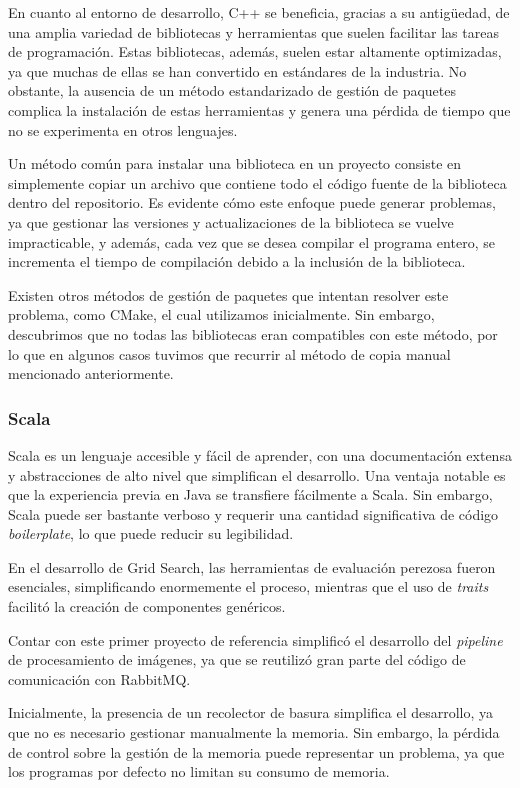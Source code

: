 \documentclass[11pt]{article}
\let\Oldsubsubsection\subsubsection
\renewcommand{\subsubsection}{\FloatBarrier\Oldsubsubsection}
\newcommand{\english}[1]{\textit{#1}}
\begin{document}
En cuanto al entorno de desarrollo, C++ se beneficia, gracias a su antigüedad, de una amplia variedad de bibliotecas y herramientas que suelen facilitar las tareas de programación. Estas bibliotecas, además, suelen estar altamente optimizadas, ya que muchas de ellas se han convertido en estándares de la industria. No obstante, la ausencia de un método estandarizado de gestión de paquetes complica la instalación de estas herramientas y genera una pérdida de tiempo que no se experimenta en otros lenguajes.

Un método común para instalar una biblioteca en un proyecto consiste en simplemente copiar un archivo que contiene todo el código fuente de la biblioteca dentro del repositorio. Es evidente cómo este enfoque puede generar problemas, ya que gestionar las versiones y actualizaciones de la biblioteca se vuelve impracticable, y además, cada vez que se desea compilar el programa entero, se incrementa el tiempo de compilación debido a la inclusión de la biblioteca.

Existen otros métodos de gestión de paquetes que intentan resolver este problema, como CMake, el cual utilizamos inicialmente. Sin embargo, descubrimos que no todas las bibliotecas eran compatibles con este método, por lo que en algunos casos tuvimos que recurrir al método de copia manual mencionado anteriormente.


\subsubsection{Scala}


Scala es un lenguaje accesible y fácil de aprender, con una documentación extensa y abstracciones de alto nivel que simplifican el desarrollo. Una ventaja notable es que la experiencia previa en Java se transfiere fácilmente a Scala. Sin embargo, Scala puede ser bastante verboso y requerir una cantidad significativa de código \english{boilerplate}, lo que puede reducir su legibilidad.

En el desarrollo de Grid Search, las herramientas de evaluación perezosa fueron esenciales, simplificando enormemente el proceso, mientras que el uso de \textit{traits} facilitó la creación de componentes genéricos.

Contar con este primer proyecto de referencia simplificó el desarrollo del \english{pipeline} de procesamiento de imágenes, ya que se reutilizó gran parte del código de comunicación con RabbitMQ.

Inicialmente, la presencia de un recolector de basura simplifica el desarrollo, ya que no es necesario gestionar manualmente la memoria. Sin embargo, la pérdida de control sobre la gestión de la memoria puede representar un problema, ya que los programas por defecto no limitan su consumo de memoria.
\end{document}
